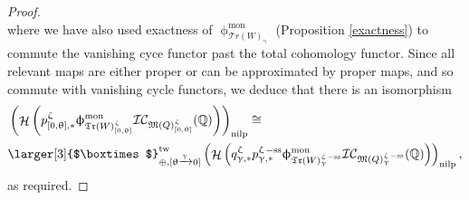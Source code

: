 \documentclass[a4paper,10pt]{amsart}
\newcommand{\Boxtimes}{\mbox{\larger[3]{$\boxtimes$}}}
\newcommand{\QQ}{\mathbb{Q}}
\newcommand{\WW}{\mathcal{T}r(W)}
\newcommand{\WWW}{\mathfrak{Tr}(W)}
\newcommand{\Mst}{\mathfrak{M}}
\newcommand{\ICS}{\mathcal{IC}}
\newcommand{\phim}[1]{\phi^{\mon}_{#1}}
\renewcommand{\theta}{\uptheta}
\renewcommand{\gamma}{\upgamma}
\renewcommand{\zeta}{\upzeta}
\renewcommand{\phi}{\upphi}
\DeclareMathOperator{\sst}{-ss}
\DeclareMathOperator{\nilp}{nilp}
\DeclareMathOperator{\tw}{tw}
\DeclareMathOperator{\mon}{mon}
\DeclareMathOperator{\Ho}{\mathcal{H}}
\begin{document}
\begin{proof}
\[\]
where we have also used exactness of $\phim{\WW_{\gamma}}$ (Proposition \ref{exactness}) to commute the vanishing cyce functor past the total cohomology functor.  Since all relevant maps are either proper or can be approximated by proper maps, and so commute with vanishing cycle functors, we deduce that there is an isomorphism
\begin{align*}
&\left(\Ho\left(p_{[0,\theta],*}^{\zeta}\phim{\WWW_{[0,\theta]}^{\zeta}}\ICS_{\Mst(Q)_{[0,\theta]}^{\zeta}}(\QQ)\right)\right)_{\nilp}\cong\\&\Boxtimes_{\oplus,[\theta\xrightarrow{\gamma}0]}^{\tw}\left(\Ho\left(q^{\zeta}_{\gamma,*}p^{\zeta\sst}_{\gamma,*}\phim{\WWW^{\zeta\sst}_{\gamma}}\ICS_{\Mst(Q)^{\zeta\sst}_{\gamma}}(\mathbb{Q})\right)\right)_{\nilp},
\end{align*}
as required.
\end{proof}
\end{document}
